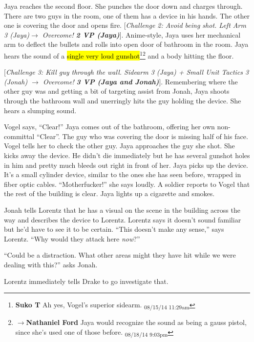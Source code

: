 Jaya reaches the second floor.  She punches the door down and charges through.  There are two guys in the room, one of them has a device in his hands.  The other one is covering the door and opens fire.  {[}\textit{Challenge 2:  Avoid being shot.  Left Arm 3 (Jaya)$\rightarrow$ Overcome! }\textit{\textbf{2 VP (Jaya)}}{]}.  Anime-style, Jaya uses her mechanical arm to deflect the bullets and rolls into open door of bathroom in the room.  Jaya hears the sound of a \hl{single very loud gunshot}\footnote{\textbf{Suko T }Ah yes, Vogel's superior sidearm. \textsubscript{08/15/14 11:29am}}\footnote{$\rightarrow$\textbf{Nathaniel Ford }Jaya would recognize the sound as being a gauss pistol, since she's used one of those before. \textsubscript{08/18/14 9:03pm}} and a body hitting the floor.



{[}\textit{Challenge 3: Kill guy through the wall.  Sidearm 3 (Jaya) + Small Unit Tactics 3 (Jonah)  $\rightarrow$ Overcome! }\textit{\textbf{3 VP (Jaya and Jonah)}}{]}.  Remembering where the other guy was and getting a bit of targeting assist from Jonah, Jaya shoots through the bathroom wall and unerringly hits the guy holding the device.  She hears a slumping sound.



Vogel says, ``Clear!''  Jaya comes out of the bathroom, offering her own non-committal ``Clear''.  The guy who was covering the door is missing half of his face.  Vogel tells her to check the other guy.  Jaya approaches the guy she shot.  She kicks away the device.  He didn't die immediately but he has several gunshot holes in him and pretty much bleeds out right in front of her.  Jaya picks up the device.  It's a small cylinder device, similar to the ones she has seen before, wrapped in fiber optic cables.  ``Motherfucker!'' she says loudly.  A soldier reports to Vogel that the rest of the building is clear.  Jaya lights up a cigarette and smokes.



Jonah tells Lorentz that he has a visual on the scene in the building across the way and describes the device to Lorentz.  Lorentz says it doesn't sound familiar but he'd have to see it to be certain.  ``This doesn't make any sense,'' says Lorentz.  ``Why would they attack here \textit{now}?''

``Could be a distraction.  What other areas might they have hit while we were dealing with this?'' asks Jonah.

Lorentz immediately tells Drake to go investigate that.

